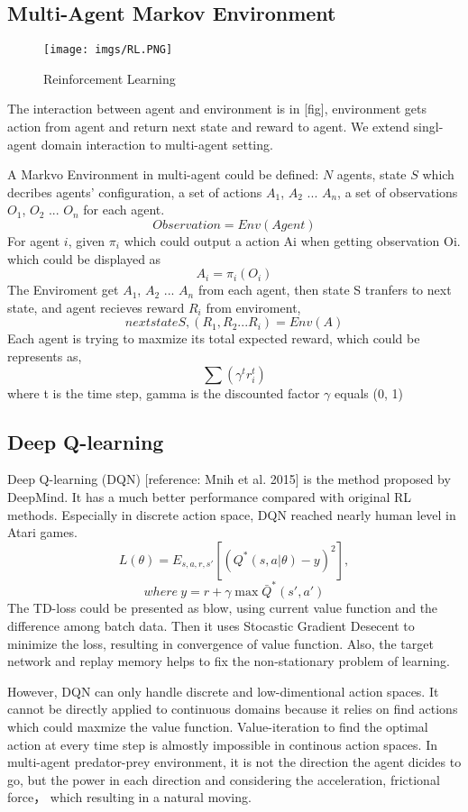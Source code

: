 \documentclass[11pt,twocolumn]{jarticle} %
\begin{document}
\subsection{Multi-Agent Markov Environment}

\begin{figure}[h]
 \begin{center}
  \texttt{[image: imgs/RL.PNG]}
  \caption{Reinforcement Learning}
  \label{fig:rl}
 \end{center}
\end{figure}

The interaction between agent and environment is in [fig], environment gets action from agent and return next state and reward to agent.
We extend singl-agent domain interaction to multi-agent setting. \par
A Markvo Environment in multi-agent could be defined: $N$ agents, 
state $S$ which decribes agents' configuration, 
a set of actions $A_1$, $A_2$ ... $A_n$,
a set of observations $O_1$, $O_2$ ... $O_n$ for each agent.
\[ Observation = Env (Agent) \]
For agent $i$, given $\pi_i$ which could output a action Ai when getting observation Oi. which could be displayed as 
\[ A_i = \pi_i (O_i) \]
The Enviroment get $A_1$, $A_2$ ... $A_n$ from each agent, 
then state S tranfers to next state, and agent recieves reward $R_i$ from enviroment,
\[ next state S, (R_1, R_2 ... R_i) = Env (A) \]
Each agent is trying to maxmize its total expected reward, which could be represents as,
\[ \sum (\gamma^t r_i^t) \]
where t is the time step, gamma is the discounted factor $\gamma$ equals (0, 1)

\subsection{Deep Q-learning}
Deep Q-learning (DQN) [reference: Mnih et al. 2015] is the method proposed by DeepMind. It has a much better performance compared with original RL methods. Especially in discrete action space, DQN reached nearly human level in Atari games.
\begin{equation}
L(\theta) = E_{s,a,r,s'}[(Q^*(s, a|\theta) - y)^2],  
\end{equation}
$$where\ y = r + \gamma\max \bar{Q}^*(s', a')$$
The TD-loss could be presented as blow, using current value function and the difference among batch data. Then it uses Stocastic Gradient Desecent to minimize the loss, resulting in convergence of value function. Also, the target network and replay memory helps to fix the non-stationary problem of learning. \par
However, DQN can only handle discrete and low-dimentional action spaces. It cannot be directly applied to continuous domains because it relies on find actions which could maxmize the value function. Value-iteration to find the optimal action at every time step is almostly impossible in continous action spaces. In multi-agent predator-prey environment, it is not the direction the agent dicides to go, but the power in each direction and considering the acceleration, frictional force， which resulting in a natural moving.
\end{document}
